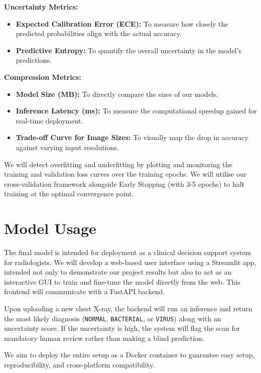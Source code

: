 \documentclass{article}
\begin{document}
\noindent \textbf{Uncertainty Metrics:}
\begin{itemize}
    \item \textbf{Expected Calibration Error (ECE):} To measure how closely the predicted probabilities align with the actual accuracy.
    \item \textbf{Predictive Entropy:} To quantify the overall uncertainty in the model's predictions.
\end{itemize}

\noindent \textbf{Compression Metrics:}
\begin{itemize}
    \item \textbf{Model Size (MB):} To directly compare the sizes of our models.
    \item \textbf{Inference Latency (ms):} To measure the computational speedup gained for real-time deployment.
    \item \textbf{Trade-off Curve for Image Sizes:} To visually map the drop in accuracy against varying input resolutions.
\end{itemize}

We will detect overfitting and underfitting by plotting and monitoring the training and validation loss curves over the training epochs. We will utilise our cross-validation framework alongside Early Stopping (with 3-5 epochs) to halt training at the optimal convergence point.

\section{Model Usage}

The final model is intended for deployment as a clinical decision support system for radiologists. We will develop a web-based user interface using a Streamlit app, intended not only to demonstrate our project results but also to act as an interactive GUI to train and fine-tune the model directly from the web. This frontend will communicate with a FastAPI backend. 

Upon uploading a new chest X-ray, the backend will run an inference and return the most likely diagnosis (\texttt{NORMAL}, \texttt{BACTERIAL}, or \texttt{VIRUS}) along with an uncertainty score. If the uncertainty is high, the system will flag the scan for mandatory human review rather than making a blind prediction.

We aim to deploy the entire setup as a Docker container to guarantee easy setup, reproducibility, and cross-platform compatibility.
\end{document}
